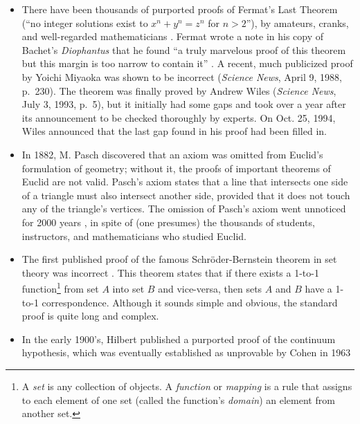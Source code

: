 \begin{itemize}
\item There have been thousands of purported proofs of Fermat's Last
Theorem (``no integer solutions exist to $x^n +
y^n = z^n$ for $n > 2$''), by amateurs, cranks, and well-regarded
mathematicians \cite[p.~5]{Stark}.  Fermat wrote a note
in his copy of Bachet's {\em Diophantus} that he found ``a truly marvelous
proof of this theorem but this margin is too narrow to contain it''
\cite[p.~507]{Kramer}.  A recent, much publicized proof by Yoichi
Miyaoka was shown to be incorrect ({\em Science News},
April 9, 1988, p.~230).  The theorem was finally proved by Andrew
Wiles ({\em Science News}, July 3, 1993, p.~5), but it
initially had some gaps and took over a year after its announcement to be
checked thoroughly by experts.  On Oct. 25, 1994, Wiles announced that the last
gap found in his proof had been filled in.
  \item In 1882, M. Pasch discovered that an axiom was omitted from Euclid's
formulation of geometry; without it, the proofs of
important theorems of Euclid are not valid.  Pasch's axiom states that a line that intersects one side of a triangle must also
intersect another side, provided that it does not touch any of the triangle's
vertices.  The omission of Pasch's axiom went unnoticed for 2000
years \cite[p.~160]{Davis}, in spite of (one presumes) the thousands of
students, instructors, and mathematicians who studied Euclid.
  \item The first published proof of the famous Schr\"{o}der-Bernstein
theorem in set theory was incorrect
\cite[p.~148]{Enderton}.  This theorem states
that if there exists a 1-to-1 function\footnote{A {\em set} is any
collection of objects. A {\em function} or {\em
mapping} is a rule that assigns to each element of one set
(called the function's {\em domain}) an element from another
set.} from set $A$ into set $B$ and vice-versa, then sets $A$ and $B$ have
a 1-to-1 correspondence.  Although it sounds simple and obvious,
the standard proof is quite long and complex.
  \item In the early 1900's, Hilbert published a
purported proof of the continuum hypothesis, which
was eventually established as unprovable by Cohen in 1963

\end{itemize}
